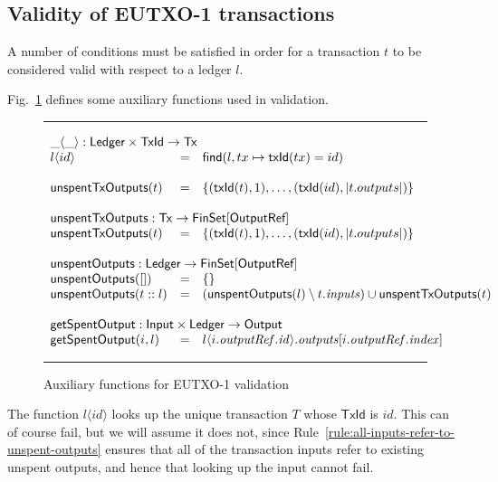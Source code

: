 \documentclass[a4paper]{article}
\newcommand{\s}{\textsf}  %
\newcommand{\msf}[1]{\ensuremath{\mathsf{#1}}}
\newcommand{\mi}[1]{\ensuremath{\mathit{#1}}}
\newcommand\rfskip{7pt}
\newenvironment{ruledfigure}[1]{\begin{figure}[#1]\hrule\vspace{\rfskip}}{\vspace{\rfskip}\hrule\end{figure}}
\newcommand{\FinSet}[1]{\ensuremath{\s{FinSet}[#1]}}
\newcommand{\TxId}{\ensuremath{\s{TxId}}}
\newcommand{\txId}{\msf{txId}}
\newcommand{\idx}{\mi{index}}
\newcommand{\inputs}{\mi{inputs}}
\newcommand{\outputs}{\mi{outputs}}
\newcommand{\outputref}{\mi{outputRef}}
\newcommand{\id}{\mi{id}}
\newcommand{\lookupTx}[2]{#1\langle#2\rangle}
\newcommand{\getSpent}{\msf{getSpentOutput}}
\newcommand{\unspent}{\msf{unspentOutputs}}
\newcommand{\txunspent}{\msf{unspentTxOutputs}}
\newcommand{\eutxotx}{\msf{Tx}}
\newcommand{\emptymap}{\ensuremath{\{\}}}
\begin{document}
\subsection{Validity of EUTXO-1 transactions}
\label{sec:eutxo-1-validity}
A number of conditions must be satisfied in order for a transaction
$t$ to be considered valid with respect to a ledger $l$.

Fig.~\ref{fig:validation-functions-1} defines some auxiliary functions used in validation.
\begin{ruledfigure}{H}
  \begin{displaymath}
  \begin{array}{lll}
  \multicolumn{3}{l}{\lookupTx{\_}{\_} : \s{Ledger} \times \TxId \rightarrow \eutxotx{}}\\
  \lookupTx{l}{id} &=& \textsf{find}(l, tx \mapsto \txId(tx) = id)\\
  \\
  \txunspent(t) &=& \{(\txId(t),1), \ldots, (\txId(id),\left|t.outputs\right|)\}\\
  \\
  \multicolumn{3}{l}{\txunspent : \eutxotx \rightarrow \FinSet{\s{OutputRef}}}\\
  \txunspent(t) &=& \{(\txId(t),1), \ldots, (\txId(id),\left|t.outputs\right|)\}\\
  \\
  \multicolumn{3}{l}{\unspent : \s{Ledger} \rightarrow \FinSet{\s{OutputRef}}}\\
  \unspent([]) &=& \emptymap \\
  \unspent(t::l) &=& (\unspent(l) \setminus t.\inputs) \cup \txunspent(t)\\
  \\
  \multicolumn{3}{l}{\getSpent : \s{Input} \times \s{Ledger} \rightarrow \s{Output}}\\
  \getSpent(i,l) &=& l\langle i.\outputref.\id \rangle.\outputs[i.\outputref.\idx]
  \end{array}
  \end{displaymath}
  \caption{Auxiliary functions for EUTXO-1 validation}
  \label{fig:validation-functions-1}
\end{ruledfigure}

\noindent The function $\lookupTx{l}{id}$ looks up the unique transaction
$T$ whose $\TxId$ is $id$. This can of course fail, but we will assume it does
not, since Rule~\ref{rule:all-inputs-refer-to-unspent-outputs} ensures that all
of the transaction inputs refer to existing unspent outputs, and hence that
looking up the input cannot fail.
\end{document}
